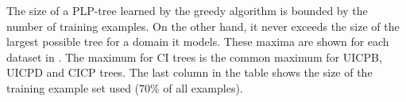 The size of a PLP-tree learned by the greedy algorithm is bounded by
the number of training examples. On the other hand, it never exceeds 
the size of the largest possible tree for a domain it models. These 
maxima are shown for each dataset in .
The maximum
for CI trees is the common maximum for UICPB, UICPD and CICP trees.
The last column in the table shows the size of the training example set
used (70\% of all examples).

